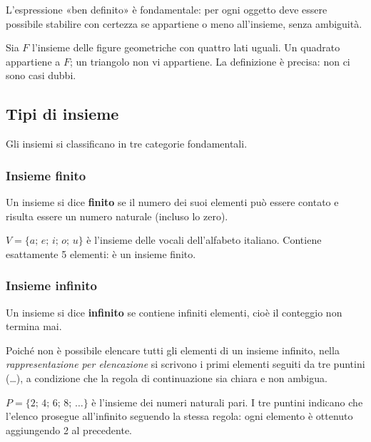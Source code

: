 L'espressione «ben definito» è fondamentale: per ogni oggetto deve essere possibile stabilire con certezza se appartiene o meno all'insieme, senza ambiguità.

\begin{esempio}
Sia $F$ l'insieme delle figure geometriche con quattro lati uguali.
Un quadrato appartiene a $F$; un triangolo non vi appartiene.
La definizione è precisa: non ci sono casi dubbi.
\end{esempio}

\subsection{Tipi di insieme}

Gli insiemi si classificano in tre categorie fondamentali.

\subsubsection*{Insieme finito}

\begin{definizione}
Un insieme si dice \textbf{finito} se il numero dei suoi elementi può essere contato e risulta essere un numero naturale (incluso lo zero).
\end{definizione}

\begin{esempio}
$V = \{a;\, e;\, i;\, o;\, u\}$ è l'insieme delle vocali dell'alfabeto italiano.
Contiene esattamente 5 elementi: è un insieme finito.
\end{esempio}

\subsubsection*{Insieme infinito}

\begin{definizione}
Un insieme si dice \textbf{infinito} se contiene infiniti elementi, cioè il conteggio non termina mai.
\end{definizione}

Poiché non è possibile elencare tutti gli elementi di un insieme infinito, nella \emph{rappresentazione per elencazione} si scrivono i primi elementi seguiti da tre puntini (\ldots), a condizione che la regola di continuazione sia chiara e non ambigua.

\begin{esempio}
$P = \{2;\, 4;\, 6;\, 8;\, \ldots\}$ è l'insieme dei numeri naturali pari.
I tre puntini indicano che l'elenco prosegue all'infinito seguendo la stessa regola: ogni elemento è ottenuto aggiungendo 2 al precedente.
\end{esempio}

